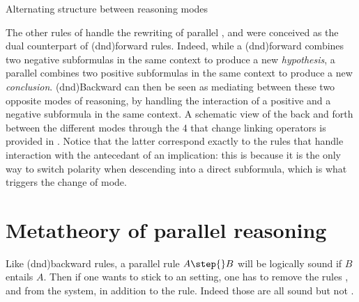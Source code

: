 \begin{marginfigure}
  \begin{center}
  \end{center}
  \caption{Alternating structure between reasoning modes}
\end{marginfigure}

The other rules of  handle the rewriting of parallel ,
and were conceived as the dual counterpart of \kl(dnd){forward} rules. Indeed, while a
\kl(dnd){forward}  combines two negative subformulas in the same context to produce
a new \emph{hypothesis}, a parallel  combines two positive subformulas in
the same context to produce a new \emph{conclusion}. \kl(dnd){Backward}  can then
be seen as mediating between these two opposite modes of reasoning, by handling
the interaction of a positive and a negative subformula in the same context. A
schematic view of the back and forth between the different modes through the 4
 that change linking operators is provided in
. Notice that the latter correspond exactly to the rules
that handle interaction with the antecedant of an implication: this is because
it is the only way to switch polarity when descending into a direct subformula,
which is what triggers the change of mode.

\section{Metatheory of parallel reasoning}

Like \kl(dnd){backward} rules, a parallel rule $A \step{} B$ will be logically sound if $B$
entails $A$. Then if one wants to stick to an  setting, one has to
remove the rules {}, {} and {} from the system, in addition to the {} rule. Indeed those
are all sound  but not .

